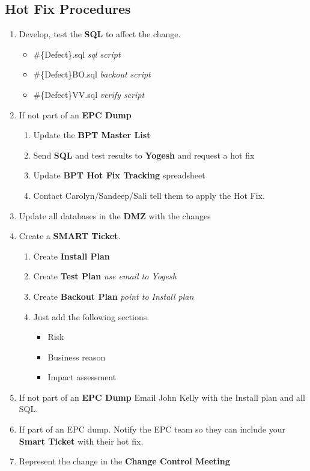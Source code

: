 \documentclass[12pt,twoside]{article}
\begin{document}
\normalsize
\subsection{Hot Fix Procedures}
\label{sec-9-15}

\begin{enumerate}
\item Develop, test the \textbf{SQL} to affect the change.
\begin{itemize}
\item \#\{Defect\}.sql \emph{sql script}
\item \#\{Defect\}BO.sql \emph{backout script}
\item \#\{Defect\}VV.sql \emph{verify script}
\end{itemize}
\item If not part of an \textbf{EPC Dump}
\begin{enumerate}
\item Update the  \textbf{BPT Master List}
\item Send \textbf{SQL} and test results to \textbf{Yogesh} and request a hot fix
\item Update \textbf{BPT Hot Fix Tracking} spreadsheet
\item Contact Carolyn/Sandeep/Sali tell them to apply the Hot Fix.
\end{enumerate}
\item Update all databases in the \textbf{DMZ} with the changes
\item Create a \textbf{SMART Ticket}.
\begin{enumerate}
\item Create \textbf{Install Plan}
\item Create \textbf{Test Plan} \emph{use email to Yogesh}
\item Create \textbf{Backout Plan} \emph{point to Install plan}
\item Just add the following sections.
\begin{itemize}
\item Risk
\item Business reason
\item Impact assessment
\end{itemize}
\end{enumerate}
\item If not part of an \textbf{EPC Dump} Email John Kelly with the Install plan and all SQL.
\item If part of an EPC dump. Notify the EPC team so they can include your \textbf{Smart Ticket} with their hot fix.
\item Represent the change in the \textbf{Change Control Meeting}
\end{enumerate}
\normalsize
\end{document}

